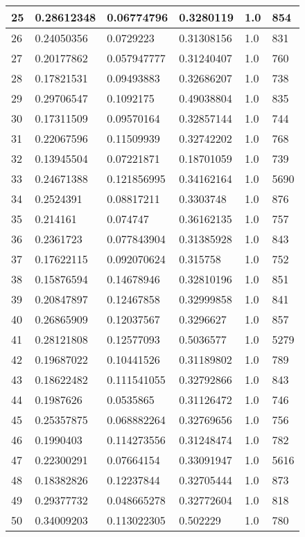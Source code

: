 \begin{longtable}{|l|l|l|l|l|l|}
25 & 0.28612348 & 0.06774796 & 0.3280119 & 1.0 & 854 \\ \hline 
26 & 0.24050356 & 0.0729223 & 0.31308156 & 1.0 & 831 \\ \hline 
27 & 0.20177862 & 0.057947777 & 0.31240407 & 1.0 & 760 \\ \hline 
28 & 0.17821531 & 0.09493883 & 0.32686207 & 1.0 & 738 \\ \hline 
29 & 0.29706547 & 0.1092175 & 0.49038804 & 1.0 & 835 \\ \hline 
30 & 0.17311509 & 0.09570164 & 0.32857144 & 1.0 & 744 \\ \hline 
31 & 0.22067596 & 0.11509939 & 0.32742202 & 1.0 & 768 \\ \hline 
32 & 0.13945504 & 0.07221871 & 0.18701059 & 1.0 & 739 \\ \hline 
33 & 0.24671388 & 0.121856995 & 0.34162164 & 1.0 & 5690 \\ \hline 
34 & 0.2524391 & 0.08817211 & 0.3303748 & 1.0 & 876 \\ \hline 
35 & 0.214161 & 0.074747 & 0.36162135 & 1.0 & 757 \\ \hline 
36 & 0.2361723 & 0.077843904 & 0.31385928 & 1.0 & 843 \\ \hline 
37 & 0.17622115 & 0.092070624 & 0.315758 & 1.0 & 752 \\ \hline 
38 & 0.15876594 & 0.14678946 & 0.32810196 & 1.0 & 851 \\ \hline 
39 & 0.20847897 & 0.12467858 & 0.32999858 & 1.0 & 841 \\ \hline 
40 & 0.26865909 & 0.12037567 & 0.3296627 & 1.0 & 857 \\ \hline 
41 & 0.28121808 & 0.12577093 & 0.5036577 & 1.0 & 5279 \\ \hline 
42 & 0.19687022 & 0.10441526 & 0.31189802 & 1.0 & 789 \\ \hline 
43 & 0.18622482 & 0.111541055 & 0.32792866 & 1.0 & 843 \\ \hline 
44 & 0.1987626 & 0.0535865 & 0.31126472 & 1.0 & 746 \\ \hline 
45 & 0.25357875 & 0.068882264 & 0.32769656 & 1.0 & 756 \\ \hline 
46 & 0.1990403 & 0.114273556 & 0.31248474 & 1.0 & 782 \\ \hline 
47 & 0.22300291 & 0.07664154 & 0.33091947 & 1.0 & 5616 \\ \hline 
48 & 0.18382826 & 0.12237844 & 0.32705444 & 1.0 & 873 \\ \hline 
49 & 0.29377732 & 0.048665278 & 0.32772604 & 1.0 & 818 \\ \hline 
50 & 0.34009203 & 0.113022305 & 0.502229 & 1.0 & 780 \\ \hline 
\end{longtable}